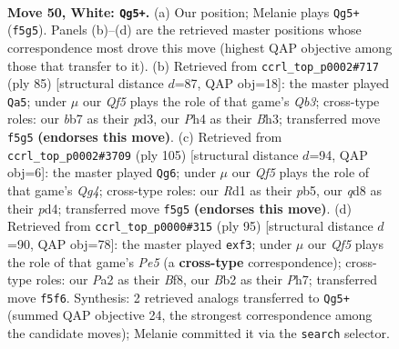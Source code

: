 \documentclass[11pt]{article}
\begin{document}
\clearpage

\begin{figure}[p]\centering
\begin{subfigure}{0.46\textwidth}\centering
\resizebox{\linewidth}{!}{%
\newchessgame
\chessboard[
  setfen={3q2k1/1b1n1p2/3P1n2/5Q2/p1p4P/5pP1/PB5K/3R4 w - - 0 50},
  showmover=false,
  pgfstyle=straightmove, color=movearrow, markmove={f5-g5}
]}
\caption{}
\end{subfigure}\hfill
\begin{subfigure}{0.46\textwidth}\centering
\resizebox{\linewidth}{!}{%
\newchessgame
\chessboard[
  setfen={6k1/5p2/1q4pb/3PQ2p/8/3PNP1b/1PB2P2/6K1 b - - 1 43},
  showmover=false,
  pgfstyle=straightmove, color=movearrow, markmove={b6-a5}
]}
\caption{}
\end{subfigure}
\\[4pt]
\begin{subfigure}{0.46\textwidth}\centering
\resizebox{\linewidth}{!}{%
\newchessgame
\chessboard[
  setfen={4k3/5p2/4p3/1P1pP1q1/3P4/5QPp/1n2N2P/5K2 b - - 7 53},
  showmover=false,
  pgfstyle=straightmove, color=movearrow, markmove={g5-g6}
]}
\caption{}
\end{subfigure}\hfill
\begin{subfigure}{0.46\textwidth}\centering
\resizebox{\linewidth}{!}{%
\newchessgame
\chessboard[
  setfen={5bk1/7p/3p4/3P3p/3Qpp2/2B2N2/r3qPP1/4N1K1 b - - 1 48},
  showmover=false,
  pgfstyle=straightmove, color=movearrow, markmove={e4-f3}
]}
\caption{}
\end{subfigure}
\caption{\textbf{Move 50, White: \texttt{Qg5+}.} (a) Our position; Melanie plays \texttt{Qg5+} (\texttt{f5g5}). Panels (b)--(d) are the retrieved master positions whose correspondence most drove this move (highest QAP objective among those that transfer to it). (b) Retrieved from \texttt{ccrl\_top\_p0002\#717} (ply 85) [structural distance $d$=87, QAP obj=18]: the master played \texttt{Qa5}; under $\mu$ our \emph{Qf5} plays the role of that game's \emph{Qb3}; cross-type roles: our \emph{b}b7 as their \emph{p}d3, our \emph{P}h4 as their \emph{B}h3; transferred move \texttt{f5g5} \textbf{(endorses this move)}. (c) Retrieved from \texttt{ccrl\_top\_p0002\#3709} (ply 105) [structural distance $d$=94, QAP obj=6]: the master played \texttt{Qg6}; under $\mu$ our \emph{Qf5} plays the role of that game's \emph{Qg4}; cross-type roles: our \emph{R}d1 as their \emph{p}b5, our \emph{q}d8 as their \emph{p}d4; transferred move \texttt{f5g5} \textbf{(endorses this move)}. (d) Retrieved from \texttt{ccrl\_top\_p0000\#315} (ply 95) [structural distance $d$=90, QAP obj=78]: the master played \texttt{exf3}; under $\mu$ our \emph{Qf5} plays the role of that game's \emph{Pe5} (a \textbf{cross-type} correspondence); cross-type roles: our \emph{P}a2 as their \emph{B}f8, our \emph{B}b2 as their \emph{P}h7; transferred move \texttt{f5f6}. Synthesis: 2 retrieved analogs transferred to \texttt{Qg5+} (summed QAP objective 24, the strongest correspondence among the candidate moves); Melanie committed it via the \texttt{search} selector.}
\label{fig:thought-m98}
\end{figure}
\end{document}
